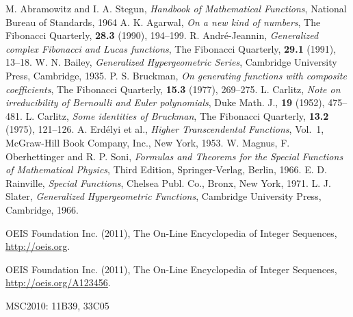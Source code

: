 \documentclass[11pt,reqno]{amsart}
\theoremstyle{plain}
\numberwithin{equation}{section}
\begin{document}
\begin{thebibliography}{99}

M. Abramowitz and I. A. Stegun, \emph{Handbook of Mathematical
Functions}, National Bureau of Standards, 1964
A. K. Agarwal, \emph{On a new kind of numbers}, The Fibonacci
Quarterly, \textbf{28.3} (1990), 194--199.
R. Andr\'{e}-Jeannin, \emph{Generalized complex Fibonacci and Lucas
functions}, The Fibonacci Quarterly, \textbf{29.1} (1991), 13--18.
W. N. Bailey, \emph{Generalized Hypergeometric Series}, Cambridge
University Press, Cambridge, 1935.
P. S. Bruckman, \emph{On generating functions with composite
coefficients}, The Fibonacci Quarterly, \textbf{15.3} (1977), 269--275.
L. Carlitz, \emph{Note on irreducibility of Bernoulli and Euler
polynomials}, Duke Math. J., \textbf{19} (1952), 475--481.
L. Carlitz, \emph{Some identities of Bruckman}, The Fibonacci
Quarterly, \textbf{13.2} (1975), 121--126.
A. Erd\'{e}lyi et al., \emph{Higher Transcendental Functions},
Vol.~1, McGraw-Hill Book Company, Inc., New York, 1953.
W. Magnus, F. Oberhettinger and R. P. Soni, \emph{Formulas and
Theorems for the Special Functions of Mathematical Physics}, Third
Edition, Springer-Verlag, Berlin, 1966.
E. D. Rainville, \emph{Special Functions}, Chelsea Publ. Co., Bronx,
New York, 1971.
L. J. Slater, \emph{Generalized Hypergeometric Functions}, Cambridge
University Press, Cambridge, 1966.

OEIS Foundation Inc. (2011), The On-Line Encyclopedia of Integer Sequences, \url{http://oeis.org}.

OEIS Foundation Inc. (2011), The On-Line Encyclopedia of Integer Sequences, \url{http://oeis.org/A123456}.
\end{thebibliography}

\medskip

\noindent MSC2010: 11B39, 33C05
\end{document}
